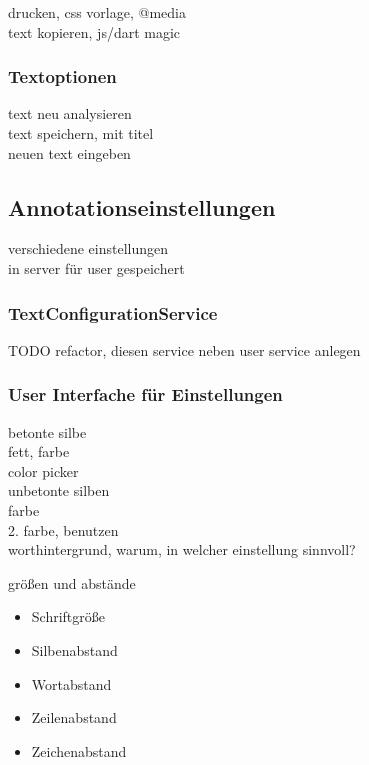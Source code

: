 drucken, css vorlage, @media\\
text kopieren, js/dart magic\\

\subsubsection{Textoptionen}

text neu analysieren\\
text speichern, mit titel\\
neuen text eingeben

\subsection{Annotationseinstellungen}

verschiedene einstellungen\\
in server für user gespeichert\\

\subsubsection{TextConfigurationService}

TODO refactor, diesen service neben user service anlegen

\subsubsection{User Interfache für Einstellungen}
betonte silbe\\
fett, farbe\\

color picker\\

unbetonte silben\\
farbe\\
2. farbe, benutzen\\

worthintergrund, warum, in welcher einstellung sinnvoll?

größen und abstände\\
\begin{itemize}
	\item Schriftgröße
	\item Silbenabstand
	\item Wortabstand
	\item Zeilenabstand
	\item Zeichenabstand
\end{itemize}

